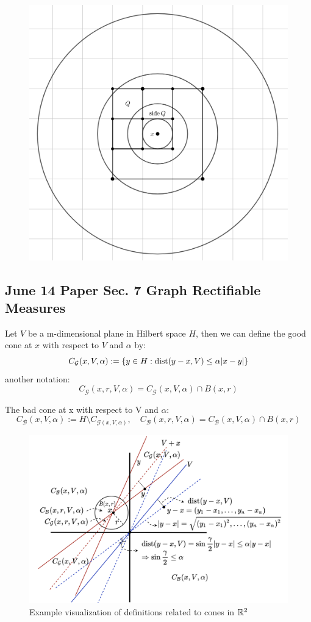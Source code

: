 \begin{figure}[H]
    \centering
    \includegraphics[width=.66\textwidth]{images/tripleMcube.png}
\end{figure}


\newpage
\subsection{June 14 Paper \texorpdfstring{\cite{naples2020}}{Lg} Sec. 7 Graph Rectifiable Measures}

\begin{definition}
    Let $V$ be a m-dimensional plane in Hilbert space $H$, then we can define the good cone at $x$ with respect to $V$ and $\alpha$ by:
    $$
    C_\mathcal{G}(x, V, \alpha) := \{y\in H: \operatorname{dist}(y-x, V) \leq \alpha |x-y|\}
    $$
    another notation:
    $$
    C_\mathcal{G}(x, r, V, \alpha) = C_\mathcal{G}(x, V, \alpha) \cap B(x, r)
    $$
\end{definition}
\begin{definition}
    The bad cone at x with respect to V and $\alpha$:
    $$
    C_\mathcal{B}(x, V, \alpha) := H\setminus C_{\mathcal{G}(x, V, \alpha)}, \quad C_\mathcal{B}(x, r, V, \alpha) = C_\mathcal{B}(x, V, \alpha) \cap B(x, r)
    $$
\end{definition}


\begin{figure}[H]
    \centering
    \includegraphics[width=.8\textwidth]{images/conedef.png}
    \caption{Example visualization of definitions related to cones in $\mathbb{R}^2$}
\end{figure}

